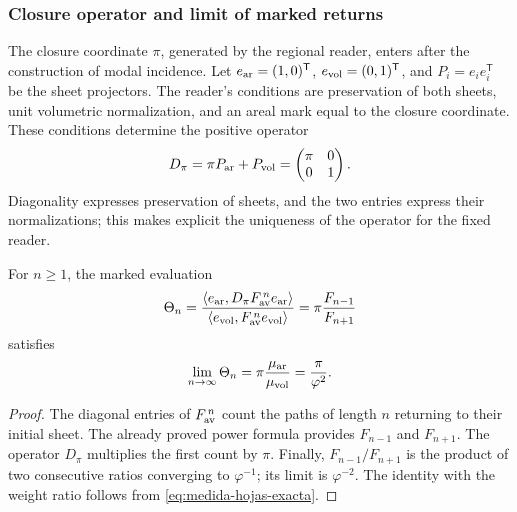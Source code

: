 \subsubsection{Closure operator and limit of marked returns}
\label{sec:operador-retorno-marcado}

The closure coordinate \(\pi\), generated by the regional reader,
enters after the construction of modal incidence. Let
\(e_{\rm ar}=(1,0)^{\mathsf T}\),
\(e_{\rm vol}=(0,1)^{\mathsf T}\), and
\(P_i=e_ie_i^{\mathsf T}\) be the sheet projectors. The reader's
conditions are preservation of both sheets, unit volumetric
normalization, and an areal mark equal to the closure coordinate. These conditions
determine the positive operator
\begin{equation}
 D_\pi=\pi P_{\rm ar}+P_{\rm vol}
       =\begin{pmatrix}\pi&0\\0&1\end{pmatrix}.
 \label{eq:operador-marca-pi}
\end{equation}
Diagonality expresses preservation of sheets, and the two entries
express their normalizations; this makes explicit the uniqueness
of the operator for the fixed reader.

\begin{proposition}
For \(n\geq1\), the marked evaluation
\begin{equation}
 \Theta_n=
 \frac{\langle e_{\rm ar},D_\pi F_{\rm av}^{\,n}e_{\rm ar}\rangle}
 {\langle e_{\rm vol},F_{\rm av}^{\,n}e_{\rm vol}\rangle}
 =\pi\frac{F_{n-1}}{F_{n+1}}
 \label{eq:retorno-marcado-finito}
\end{equation}
satisfies
\begin{equation}
 \lim_{n\to\infty}\Theta_n
 =\pi\frac{\mu_{\rm ar}}{\mu_{\rm vol}}
 =\frac{\pi}{\varphi^2}.
 \label{eq:retorno-marcado-limite}
\end{equation}
\end{proposition}
\begin{proof}
The diagonal entries of \(F_{\rm av}^{\,n}\) count the paths
of length \(n\) returning to their initial sheet. The already proved power
formula provides \(F_{n-1}\) and \(F_{n+1}\). The operator
\(D_\pi\) multiplies the first count by \(\pi\). Finally,
\(F_{n-1}/F_{n+1}\) is the product of two consecutive ratios
converging to \(\varphi^{-1}\); its limit is
\(\varphi^{-2}\). The identity with the weight ratio follows from
\eqref{eq:medida-hojas-exacta}.
\end{proof}


